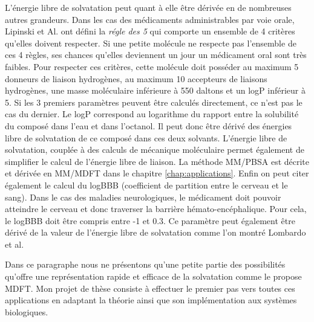 L'énergie libre de solvatation peut quant à elle être dérivée en de nombreuses autres grandeurs. Dans les cas des médicaments administrables par voie orale, Lipinski et Al.\cite{Lipinski_lead_2004} ont défini la \textit{régle des 5} qui comporte un ensemble de 4 critères qu'elles doivent respecter. Si une petite molécule ne respecte pas l'ensemble de ces 4 règles, ses chances qu'elles deviennent un jour un médicament oral sont très faibles. Pour respecter ces critères, cette molécule doit posséder au maximum 5 donneurs de liaison hydrogènes, au maximum 10 accepteurs de liaisons hydrogènes, une masse moléculaire inférieure à 550 daltons et un logP inférieur à 5. Si les 3 premiers paramètres peuvent être calculés directement, ce n'est pas le cas du dernier. Le logP correspond au logarithme du rapport entre la solubilité du composé dans l'eau et dans l'octanol. Il peut donc être dérivé des énergies libre de solvatation de ce composé dans ces deux solvants. L'énergie libre de solvatation, couplée à des calculs de mécanique moléculaire permet également de simplifier le calcul de l'énergie libre de liaison. La méthode MM/PBSA\cite{genheden_mm/pbsa_2015} est décrite et dérivée en MM/MDFT dans le chapitre \ref{chap:applications}. Enfin on peut citer également le calcul du logBBB (coefficient de partition entre le cerveau et le sang). Dans le cas des maladies neurologiques, le médicament doit pouvoir atteindre le cerveau et donc traverser la barrière hémato-encéphalique. Pour cela, le logBBB doit être compris entre -1 et 0.3\cite{Vilar_prediction_2010}. Ce paramètre peut également être dérivé de la valeur de l'énergie libre de solvatation comme l'on montré Lombardo et al\cite{Lombardo_computation_1996}.

Dans ce paragraphe nous ne présentons qu'une petite partie des possibilités qu'offre une représentation rapide et efficace de la solvatation comme le propose MDFT. Mon projet de thèse consiste à effectuer le premier pas vers toutes ces applications en adaptant la théorie ainsi que son implémentation aux systèmes biologiques.




\vspace{8\baselineskip}





